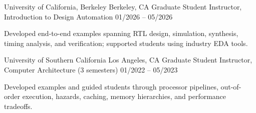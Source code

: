 


\begin{cventries}
    \setlength\leftmargini{4ex}
    \renewcommand{\labelitemi}{---}
    \setlength\leftmarginii{1ex}
    \renewcommand{\labelitemii}{$\circ$}
    \setlength\cventrywidth{3.5cm}

\cventry
{University of California, Berkeley}
{Berkeley, CA} %
{Graduate Student Instructor, Introduction to Design Automation} %
{01/2026 -- 05/2026} %
{
\vspace{-4.0mm}
\begin{cvitems}
  \item {Developed end-to-end examples spanning RTL design, simulation, synthesis, timing analysis, and verification; supported students using industry EDA tools.}
\end{cvitems}
}

  \cventry
{University of Southern California}
{Los Angeles, CA} %
{Graduate Student Instructor, Computer Architecture (3 semesters)} %
{01/2022 -- 05/2023} %
{
\vspace{-4.0mm}
\begin{cvitems}
  \item {Developed examples and guided students through processor pipelines, out-of-order execution, hazards, caching, memory hierarchies, and performance tradeoffs.}
\end{cvitems}
}

\end{cventries}
